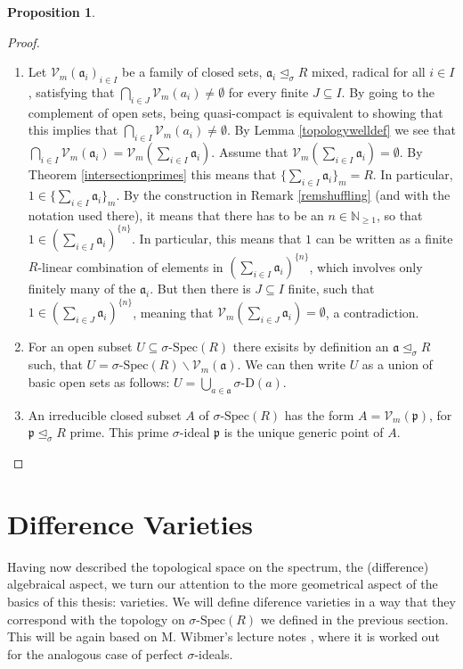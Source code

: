 \documentclass{article}
\def\NE{\mathbb{N}_{\geq1}}
\def\Vm{\mathcal{V}_m}
\def\a{\mathfrak{a}}
\def\p{\mathfrak{p}}
\def\s{\sigma}
\def\si{\unlhd_{\sigma}}
\def\sSpec{\sigma\text{-Spec}}
\newenvironment{bew}{\begin{proof}[Proof]}{\end{proof}}
\theoremstyle{definition}
\newtheorem{prop}[Satz]{Proposition}
\begin{document}
\begin{prop}
\begin{bew}
\begin{enumerate}
\item Let $\Vm(\a_i)_{i \in I}$ be a family of closed sets, $\a_i \si R$ mixed, radical for all $i \in I$, satisfying that 
$\bigcap_{i \in J} \Vm( a_i) \neq \emptyset$ for every finite $J \subseteq I$. By  going to the complement of open sets, being quasi-compact is equivalent to showing that this implies that $\bigcap_{i \in I} \Vm(a_i) \neq \emptyset$.
By Lemma \ref{topologywelldef} we see that $\bigcap_{i \in I} \Vm( \a_i) = \Vm ( \sum_{i \in I} \a_i)$. Assume that $ \Vm ( \sum_{i \in I} \a_i) = \emptyset$. 
By Theorem \ref{intersectionprimes} this means that $\{ \sum_{i \in I} \a_i \}_m = R$. In particular, $1 \in \{ \sum_{i \in I} \a_i \}_m$. By the construction in Remark \ref{remshuffling} (and with the notation used there), it means that there has to be an $n \in \NE$,
so that $1 \in (\sum_{i \in I} \a_i )^{\{n\}}$. In particular, this means that $1$ can be written as a finite $R$-linear combination of elements in $(\sum_{i \in I} \a_i )^{\{n\}}$, which involves only finitely many of the $\a_i$.
But then there is $J \subseteq I$ finite, such that $1 \in (\sum_{i \in J} \a_i)^{\{n\}}$, meaning that $\Vm(\sum_{i \in J} \a_i) = \emptyset$, a contradiction. 
\item For an open subset $U \subseteq \sSpec(R)$ there exisits by definition an $\a \si R$ such, that $U = \sSpec(R) \backslash \Vm(\a)$. We can then write $U$ as a union of basic open sets as follows: $U = \bigcup_{a \in \a} \s$-D$(a)$.
\item An irreducible closed subset $A$ of $\sSpec(R)$ has the form $A = \Vm(\p)$, for $\p \si R$ prime. This prime $\s$-ideal $\p$ is the unique generic point of $A$.
\end{enumerate}
\end{bew}
\end{prop}

\clearpage
\section{Difference Varieties}


Having now described the topological space on the spectrum, the (difference) algebraical aspect, we turn our attention to the more geometrical aspect of the basics of this thesis: varieties.
We will define diference varieties in a way that they correspond with the topology on $\sSpec(R)$ we defined in the previous section. This will be again based on M. Wibmer's lecture notes \cite{wibmer}, 
where it is worked out for the analogous case of perfect $\s$-ideals.
\end{document}
